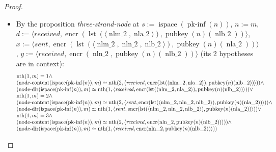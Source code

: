 \documentclass[11pt]{article}
\theoremstyle{plain}
\begin{document}
\begin{proof}
\begin{itemize}[leftmargin=2.8em, itemsep=4pt, parsep=1pt]
\begin{itemize}[leftmargin=2.8em, itemsep=4pt, parsep=1pt]
  \item[\textbf{490}] By the proposition \emph{three-strand-node} at $s := \operatorname{ispace}(\operatorname{pk\text{-}inf}(n))$, $n := m$, $d := \langle \mathit{received}, \operatorname{encr}(\operatorname{lst}(\langle \operatorname{nlm\_2}, \operatorname{nla\_2} \rangle), \operatorname{pubkey}(n)(\operatorname{nlb\_2})) \rangle$, $x := \langle \mathit{sent}, \operatorname{encr}(\operatorname{lst}(\langle \operatorname{nlm\_2}, \operatorname{nln\_2}, \operatorname{nlb\_2} \rangle), \operatorname{pubkey}(n)(\operatorname{nla\_2})) \rangle$, $y := \langle \mathit{received}, \operatorname{encr}(\operatorname{nln\_2}, \operatorname{pubkey}(n)(\operatorname{nlb\_2})) \rangle$ (its 2 hypotheses are in context):
\begin{equation*}
\begin{array}{@{}l@{}} \operatorname{nth}(1, m) = 1 \wedge \\ (\operatorname{node\text{-}content}(\operatorname{ispace}(\operatorname{pk\text{-}inf}(n)), m) \simeq \operatorname{nth}(2, \langle \mathit{received}, \operatorname{encr}(\operatorname{lst}(\langle \operatorname{nlm\_2}, \operatorname{nla\_2} \rangle), \operatorname{pubkey}(n)(\operatorname{nlb\_2})) \rangle)) \wedge \\ (\operatorname{node\text{-}dir}(\operatorname{ispace}(\operatorname{pk\text{-}inf}(n)), m) \simeq \operatorname{nth}(1, \langle \mathit{received}, \operatorname{encr}(\operatorname{lst}(\langle \operatorname{nlm\_2}, \operatorname{nla\_2} \rangle), \operatorname{pubkey}(n)(\operatorname{nlb\_2})) \rangle)) \vee \\ \operatorname{nth}(1, m) = 2 \wedge \\ (\operatorname{node\text{-}content}(\operatorname{ispace}(\operatorname{pk\text{-}inf}(n)), m) \simeq \operatorname{nth}(2, \langle \mathit{sent}, \operatorname{encr}(\operatorname{lst}(\langle \operatorname{nlm\_2}, \operatorname{nln\_2}, \operatorname{nlb\_2} \rangle), \operatorname{pubkey}(n)(\operatorname{nla\_2})) \rangle)) \wedge \\ (\operatorname{node\text{-}dir}(\operatorname{ispace}(\operatorname{pk\text{-}inf}(n)), m) \simeq \operatorname{nth}(1, \langle \mathit{sent}, \operatorname{encr}(\operatorname{lst}(\langle \operatorname{nlm\_2}, \operatorname{nln\_2}, \operatorname{nlb\_2} \rangle), \operatorname{pubkey}(n)(\operatorname{nla\_2})) \rangle)) \vee \\ \operatorname{nth}(1, m) = 3 \wedge \\ (\operatorname{node\text{-}content}(\operatorname{ispace}(\operatorname{pk\text{-}inf}(n)), m) \simeq \operatorname{nth}(2, \langle \mathit{received}, \operatorname{encr}(\operatorname{nln\_2}, \operatorname{pubkey}(n)(\operatorname{nlb\_2})) \rangle)) \wedge \\ (\operatorname{node\text{-}dir}(\operatorname{ispace}(\operatorname{pk\text{-}inf}(n)), m) \simeq \operatorname{nth}(1, \langle \mathit{received}, \operatorname{encr}(\operatorname{nln\_2}, \operatorname{pubkey}(n)(\operatorname{nlb\_2})) \rangle)) \end{array}

\end{equation*}
\end{itemize}
\end{itemize}
\end{proof}
\end{document}
